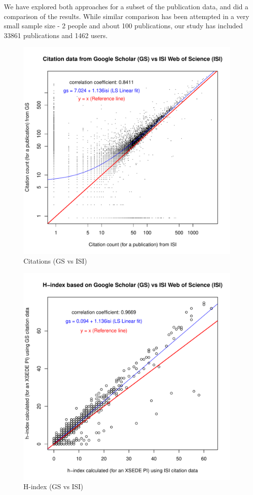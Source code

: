We have explored both approaches for a subset of the publication data, and did a comparison of the results. While similar comparison has been attempted \cite{yang2006citation} in a very small sample size - 2 people and about 100 publications, our study has included 33861 publications and 1462 users.

\begin{figure}[htb]
  \centering
    \includegraphics[width=1.0\columnwidth]{images/11_gs_vs_isi_cites.pdf}
  \caption{Citations (GS vs ISI)}\label{F:gs-vs-isi-cites}
\end{figure}

\begin{figure}[htb]
  \centering
    \includegraphics[width=1.0\columnwidth]{images/11_gs_vs_isi_hindex.pdf}
  \caption{H-index (GS vs ISI)}\label{F:gs-vs-isi-hindex}
\end{figure}

